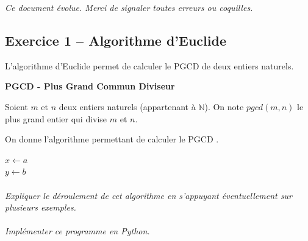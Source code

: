 \documentclass[11pt,oneside]{article}
\begin{document}
%
%
%

\textit{Ce document évolue. Merci de signaler toutes erreurs ou coquilles.}



\subsection*{Exercice 1 -- Algorithme d'Euclide}
L'algorithme d'Euclide permet de calculer le PGCD de deux entiers naturels. 



\begin{defi}
\textbf{PGCD - Plus Grand Commun Diviseur}

Soient $m$ et $n$ deux entiers naturels (appartenant à $\mathbb{N}$). On note $pgcd(m,n)$ le plus grand entier qui divise $m$ et $n$.
\end{defi}

On donne l'algorithme permettant de calculer le PGCD .

\begin{pseudo}
\begin{algorithm}[H]
$x\gets a$\\
$y\gets b$\\


\end{algorithm}
\end{pseudo}

\paragraph{}
\textit{Expliquer le déroulement de cet algorithme en s'appuyant éventuellement sur plusieurs exemples.}

\paragraph{}
\textit{Implémenter ce programme en Python.}
\end{document}
